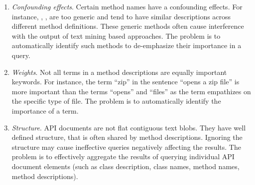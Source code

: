 \begin{enumerate}
		
	\item \textit{Confounding effects}. Certain method names have a confounding effects. For instance, , ,  are too generic and tend to have similar descriptions across different method definitions. These generic methods often cause interference with the output of text mining based approaches. The problem is to automatically identify such methods to de-emphasize their importance in a query. 
	
	\item \textit{Weights}. Not all terms in a method descriptions are equally important keywords. For instance, the term ``zip'' in the sentence ``opens a zip file'' is more important than the terms ``opens'' and ``files'' as the term empathizes on the specific type of file. The problem is to automatically identify the importance of a term.
	
	\item \textit{Structure}. API documents are not flat contiguous text blobs. They have well defined structure, that is often shared by method descriptions. Ignoring the structure may cause ineffective queries negatively affecting the results. The problem is to effectively aggregate the results of querying individual API document elements (such as class description, class names, method names, method descriptions).
			
	
\end{enumerate}
